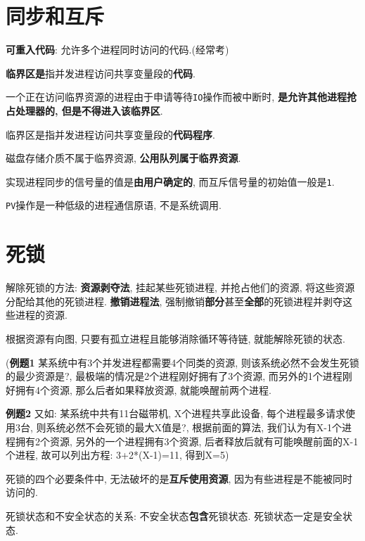 \section{同步和互斥}
\textbf{可重入代码}: 允许多个进程同时访问的代码.(经常考)\par \vspace{.5em}
\textbf{临界区是}指并发进程访问共享变量段的\textbf{代码}.\par \vspace{.5em}
一个正在访问临界资源的进程由于申请等待\verb|IO|操作而被中断时, \textbf{是允许其他进程抢占处理器的, 但是不得进入该临界区}.\par \vspace{.5em}
临界区是指并发进程访问共享变量段的\textbf{代码程序}.\par \vspace{.5em}
磁盘存储介质不属于临界资源, \textbf{公用队列属于临界资源}.\par \vspace{.5em}
实现进程同步的信号量的值是\textbf{由用户确定的}, 而互斥信号量的初始值一般是\verb|1|.\par \vspace{.5em}
\verb|PV|操作是一种低级的进程通信原语, 不是系统调用.\par \vspace{.5em}
\section{死锁}
解除死锁的方法: \textbf{资源剥夺法}, 挂起某些死锁进程, 并抢占他们的资源, 将这些资源分配给其他的死锁进程. \textbf{撤销进程法}, 强制撤销\textbf{部分}甚至\textbf{全部}的死锁进程并剥夺这些进程的资源.\par \vspace{.5em}
根据资源有向图, 只要有孤立进程且能够消除循环等待链, 就能解除死锁的状态.\par  {\kaishu(\textbf{例题1} 某系统中有3个并发进程都需要4个同类的资源, 则该系统必然不会发生死锁的最少资源是?, 最极端的情况是2个进程刚好拥有了3个资源, 而另外的1个进程刚好拥有4个资源, 那么后者如果释放资源, 就能唤醒前两个进程.\par \textbf{例题2} 又如: 某系统中共有11台磁带机, X个进程共享此设备, 每个进程最多请求使用3台, 则系统必然不会死锁的最大X值是?, 根据前面的算法, 我们认为有X-1个进程拥有2个资源, 另外的一个进程拥有3个资源, 后者释放后就有可能唤醒前面的X-1个进程, 故可以列出方程: 3+2*(X-1)=11, 得到X=5)}\par \vspace{.5em}
死锁的四个必要条件中, 无法破坏的是\textbf{互斥使用资源}, 因为有些进程是不能被同时访问的.\par \vspace{.5em}
死锁状态和不安全状态的关系: 不安全状态\textbf{包含}死锁状态. 死锁状态一定是安全状态.


